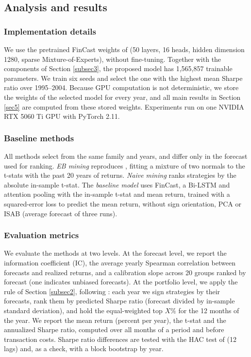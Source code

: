 \documentclass[pdflatex,sn-mathphys-num]{sn-jnl}%
\theoremstyle{thmstyleone}%
\theoremstyle{thmstyletwo}%
\theoremstyle{thmstylethree}%
\begin{document}
\subsection{Analysis and results}\label{subsec4_2}

\subsubsection{Implementation details}
We use the pretrained FinCast weights of \cite{zhu2025fincast} (50 layers, 16 heads, hidden dimension 1280, sparse Mixture-of-Experts), without fine-tuning. Together with the components of Section \ref{subsec3}, the proposed model has 1,565,857 trainable parameters. We train six seeds and select the one with the highest mean Sharpe ratio over 1995--2004. Because GPU computation is not deterministic, we store the weights of the selected model for every year, and all main results in Section \ref{sec5} are computed from these stored weights. Experiments run on one NVIDIA RTX 5060 Ti GPU with PyTorch 2.11.

\subsubsection{Baseline methods}
All methods select from the same family and years, and differ only in the forecast used for ranking. \textit{EB mining} reproduces \cite{chen2025highthroughputassetpricing}, fitting a mixture of two normals to the t-stats with the past 20 years of returns. \textit{Naive mining} ranks strategies by the absolute in-sample t-stat. The \textit{baseline model} uses FinCast, a Bi-LSTM and attention pooling with the in-sample t-stat and mean return, trained with a squared-error loss to predict the mean return, without sign orientation, PCA or ISAB (average forecast of three runs).

\subsubsection{Evaluation metrics}
We evaluate the methods at two levels. At the forecast level, we report the information coefficient (IC), the average yearly Spearman correlation between forecasts and realized returns, and a calibration slope across 20 groups ranked by forecast (one indicates unbiased forecasts). At the portfolio level, we apply the rule of Section \ref{subsec2}, following \cite{chen2025highthroughputassetpricing}: each year we sign strategies by their forecasts, rank them by predicted Sharpe ratio (forecast divided by in-sample standard deviation), and hold the equal-weighted top $X\%$ for the 12 months of the year. We report the mean return (percent per year), the t-stat and the annualized Sharpe ratio, computed over all months of a period and before transaction costs. Sharpe ratio differences are tested with the HAC test of \cite{ledoit2008robust} (12 lags) and, as a check, with a block bootstrap by year.
\end{document}
